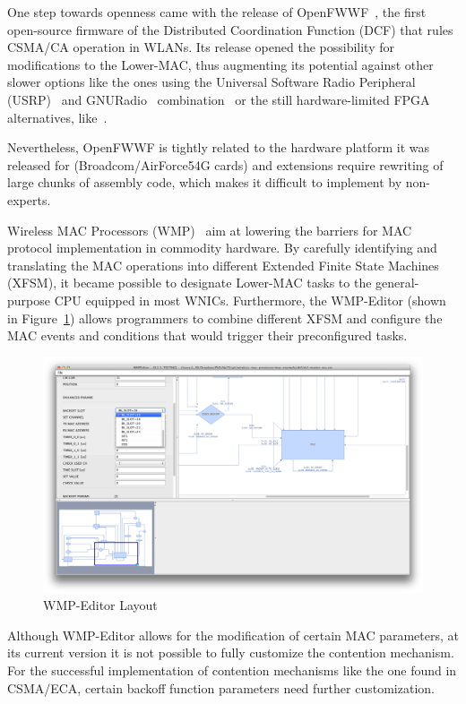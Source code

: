 One step towards openness came with the release of OpenFWWF~\cite{OpenFWWF}, the first open-source firmware of the Distributed Coordination Function (DCF) that rules CSMA/CA operation in WLANs. Its release opened the possibility for modifications to the Lower-MAC, thus augmenting its potential against other slower options like the ones using the Universal Software Radio Peripheral (USRP)~\cite{ettus2008universal} and GNURadio~\cite{blossom2004gnu} combination~\cite{tan2011sora} or the still hardware-limited FPGA alternatives, like~\cite{ng2010airblue}.

Nevertheless, OpenFWWF is tightly related to the hardware platform it was released for (Broadcom/AirForce54G cards) and extensions require rewriting of large chunks of assembly code, which makes it difficult to implement by non-experts.

Wireless MAC Processors (WMP)~\cite{WMP} aim at lowering the barriers for MAC protocol implementation in commodity hardware. By carefully identifying and translating the MAC operations into different Extended Finite State Machines (XFSM), it became possible to designate Lower-MAC tasks to the general-purpose CPU equipped in most WNICs. Furthermore, the WMP-Editor (shown in Figure~\ref{fig:WMPEditor}) allows programmers to combine different XFSM and configure the MAC events and conditions that would trigger their preconfigured tasks.


\begin{figure}[htbp]
  \centering
  \includegraphics[width=\linewidth]{WMP-EditorLayout.eps}
  \caption{WMP-Editor Layout
  \label{fig:WMPEditor}}
\end{figure}

Although WMP-Editor allows for the modification of certain MAC parameters, at its current version it is not possible to fully customize the contention mechanism. For the successful implementation of contention mechanisms like the one found in CSMA/ECA, certain backoff function parameters need further customization.